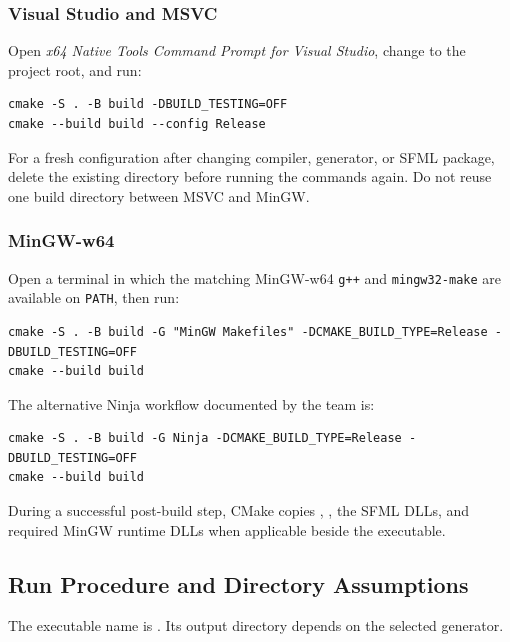 \documentclass{template}
\begin{document}
\subsubsection{Visual Studio and MSVC}

Open \emph{x64 Native Tools Command Prompt for Visual Studio}, change to the
project root, and run:

\begin{lstlisting}[style=gamecode,numbers=none,caption={Release build with the Visual Studio toolchain.}]
cmake -S . -B build -DBUILD_TESTING=OFF
cmake --build build --config Release
\end{lstlisting}

For a fresh configuration after changing compiler, generator, or SFML package,
delete the existing  directory before running the commands again.
Do not reuse one build directory between MSVC and MinGW.

\subsubsection{MinGW-w64}

Open a terminal in which the matching MinGW-w64 \texttt{g++} and
\texttt{mingw32-make} are available on \texttt{PATH}, then run:

\begin{lstlisting}[style=gamecode,numbers=none,caption={Release build with MinGW-w64.}]
cmake -S . -B build -G "MinGW Makefiles" -DCMAKE_BUILD_TYPE=Release -DBUILD_TESTING=OFF
cmake --build build
\end{lstlisting}

The alternative Ninja workflow documented by the team is:

\begin{lstlisting}[style=gamecode,numbers=none,caption={Optional Ninja build.}]
cmake -S . -B build -G Ninja -DCMAKE_BUILD_TYPE=Release -DBUILD_TESTING=OFF
cmake --build build
\end{lstlisting}

During a successful post-build step, CMake copies ,
, the SFML DLLs, and required MinGW runtime DLLs when applicable
beside the executable.

\subsection{Run Procedure and Directory Assumptions}

The executable name is . Its output directory depends on
the selected generator.
\end{document}

